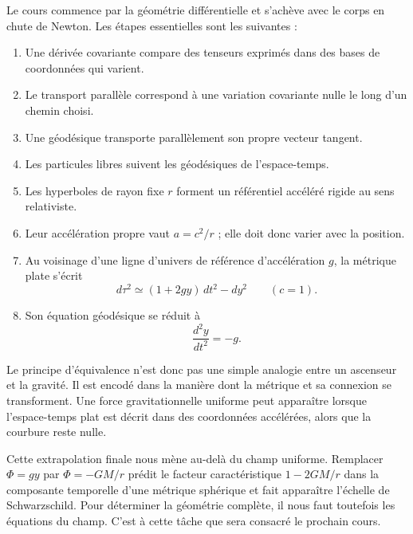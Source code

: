 Le cours commence par la géométrie différentielle et s'achève avec le corps en chute de Newton. Les étapes essentielles sont les suivantes :
\begin{enumerate}
\item Une dérivée covariante compare des tenseurs exprimés dans des bases de coordonnées qui varient.
\item Le transport parallèle correspond à une variation covariante nulle le long d'un chemin choisi.
\item Une géodésique transporte parallèlement son propre vecteur tangent.
\item Les particules libres suivent les géodésiques de l'espace-temps.
\item Les hyperboles de rayon fixe \(r\) forment un référentiel accéléré rigide au sens relativiste.
\item Leur accélération propre vaut \(a=c^2/r\) ; elle doit donc varier avec la position.
\item Au voisinage d'une ligne d'univers de référence d'accélération \(g\), la métrique plate s'écrit
\begin{equation}
d\tau^2\simeq(1+2gy)\,dt^2-dy^2
\qquad(c=1).
\end{equation}
\item Son équation géodésique se réduit à
\begin{equation}
\frac{d^2y}{dt^2}=-g.
\end{equation}
\end{enumerate}

Le principe d'équivalence n'est donc pas une simple analogie entre un ascenseur et la gravité. Il est encodé dans la manière dont la métrique et sa connexion se transforment. Une force gravitationnelle uniforme peut apparaître lorsque l'espace-temps plat est décrit dans des coordonnées accélérées, alors que la courbure reste nulle.

Cette extrapolation finale nous mène au-delà du champ uniforme. Remplacer \(\Phi=gy\) par \(\Phi=-GM/r\) prédit le facteur caractéristique \(1-2GM/r\) dans la composante temporelle d'une métrique sphérique et fait apparaître l'échelle de Schwarzschild. Pour déterminer la géométrie complète, il nous faut toutefois les équations du champ. C'est à cette tâche que sera consacré le prochain cours.
